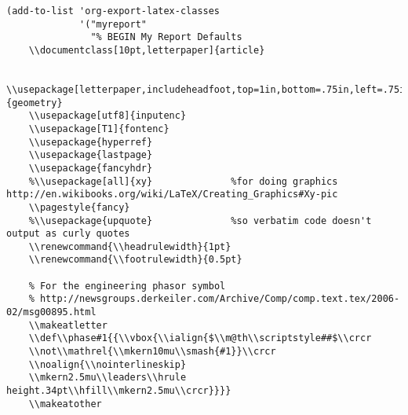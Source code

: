 \documentclass[11pt]{article}
\begin{document}
\begin{verbatim}
(add-to-list 'org-export-latex-classes
             '("myreport"
               "% BEGIN My Report Defaults
    \\documentclass[10pt,letterpaper]{article}
    
    \\usepackage[letterpaper,includeheadfoot,top=1in,bottom=.75in,left=.75in,right=.75in]{geometry}
    \\usepackage[utf8]{inputenc}
    \\usepackage[T1]{fontenc}
    \\usepackage{hyperref}
    \\usepackage{lastpage}
    \\usepackage{fancyhdr}
    %\\usepackage[all]{xy}              %for doing graphics http://en.wikibooks.org/wiki/LaTeX/Creating_Graphics#Xy-pic
    \\pagestyle{fancy}
    %\\usepackage{upquote}              %so verbatim code doesn't output as curly quotes
    \\renewcommand{\\headrulewidth}{1pt}
    \\renewcommand{\\footrulewidth}{0.5pt}
    
    % For the engineering phasor symbol
    % http://newsgroups.derkeiler.com/Archive/Comp/comp.text.tex/2006-02/msg00895.html
    \\makeatletter
    \\def\\phase#1{{\\vbox{\\ialign{$\\m@th\\scriptstyle##$\\crcr
    \\not\\mathrel{\\mkern10mu\\smash{#1}}\\crcr
    \\noalign{\\nointerlineskip}
    \\mkern2.5mu\\leaders\\hrule height.34pt\\hfill\\mkern2.5mu\\crcr}}}}
    \\makeatother
    

\end{verbatim}
\end{document}
